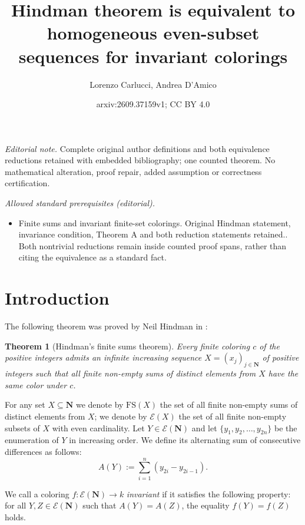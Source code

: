 \documentclass[10pt,a4paper]{amsart}
\title{Hindman theorem is equivalent to homogeneous even-subset sequences for invariant colorings}
\author{Lorenzo Carlucci, Andrea D'Amico}
\date{arxiv:2609.37159v1; CC BY 4.0}
\newcommand{\Nat}{\mathbf{N}}
\newcommand{\FS}{\mathrm{FS}}
\newtheorem*{theorem*}{Theorem}
\theoremstyle{definition}
\begin{document}
\maketitle
\noindent\textit{Editorial note.} Complete original author definitions and both equivalence reductions retained with embedded bibliography; one counted theorem. No mathematical alteration, proof repair, added assumption or correctness certification.\par\medskip
\noindent\textit{Allowed standard prerequisites (editorial).}\begin{itemize}
\item Finite sums and invariant finite-set colorings. Original Hindman statement, invariance condition, Theorem A and both reduction statements retained.. Both nontrivial reductions remain inside counted proof spans, rather than citing the equivalence as a standard fact.
\end{itemize}\medskip
\section{Introduction}
The following theorem was proved by Neil Hindman in \cite{Hin:74}: 

\begin{theorem*}[Hindman's finite sums theorem]
Every finite coloring $c$ of the positive integers admits an infinite increasing
sequence $X = (x_j)_{j \in\Nat}$ of positive integers such that all finite non-empty sums of distinct elements from $X$ have the same color under $c$.
\end{theorem*}


For any set $X\subseteq\Nat$ we denote by $\FS(X)$ the set of all finite non-empty sums of distinct elements from $X$; we denote by $\mathcal{E}(X)$ the set of all finite non-empty subsets of $X$ with even cardinality. Let $Y\in \mathcal{E}(\Nat)$ and let $\{y_1,y_2,\dots,y_{2n}\}$ be the enumeration of $Y$ in increasing order. We define its alternating sum of consecutive differences as follows:
 $$A(Y):=\sum_{i=1}^{n}(y_{2i}-y_{2i-1}).$$

We call a coloring $f: \mathcal{E}(\Nat) \to k$ {\em invariant} if it satisfies the following property: for all $Y, Z \in \mathcal{E}(\Nat)$ such that $A(Y) = A(Z)$, the equality $f(Y) = f(Z)$ holds. 
\end{document}
